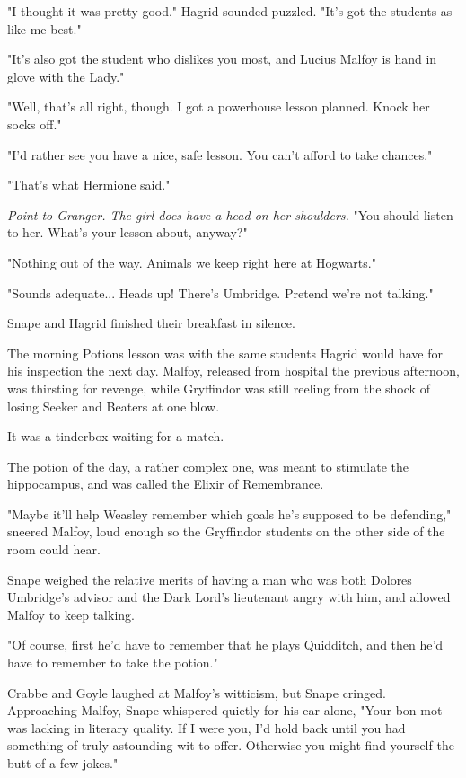 \documentclass[a4paper,11pt]{article}
\begin{document}
"I thought it was pretty good." Hagrid sounded puzzled. "It's got the students as like me best."

"It's also got the student who dislikes you most, and Lucius Malfoy is hand in glove with the Lady."

"Well, that's all right, though. I got a powerhouse lesson planned. Knock her socks off."

"I'd rather see you have a nice, safe lesson. You can't afford to take chances."

"That's what Hermione said."

\emph{Point to Granger. The girl does have a head on her shoulders.} "You should listen to her. What's your lesson about, anyway?"

"Nothing out of the way. Animals we keep right here at Hogwarts."

"Sounds adequate... Heads up! There's Umbridge. Pretend we're not talking."

Snape and Hagrid finished their breakfast in silence.

The morning Potions lesson was with the same students Hagrid would have for his inspection the next day. Malfoy, released from hospital the previous afternoon, was thirsting for revenge, while Gryffindor was still reeling from the shock of losing Seeker and Beaters at one blow.

It was a tinderbox waiting for a match.

The potion of the day, a rather complex one, was meant to stimulate the hippocampus, and was called the Elixir of Remembrance.

"Maybe it'll help Weasley remember which goals he's supposed to be defending," sneered Malfoy, loud enough so the Gryffindor students on the other side of the room could hear.

Snape weighed the relative merits of having a man who was both Dolores Umbridge's advisor and the Dark Lord's lieutenant angry with him, and allowed Malfoy to keep talking.

"Of course, first he'd have to remember that he plays Quidditch, and then he'd have to remember to take the potion."

Crabbe and Goyle laughed at Malfoy's witticism, but Snape cringed. Approaching Malfoy, Snape whispered quietly for his ear alone, "Your bon mot was lacking in literary quality. If I were you, I'd hold back until you had something of truly astounding wit to offer. Otherwise you might find yourself the butt of a few jokes."
\end{document}
